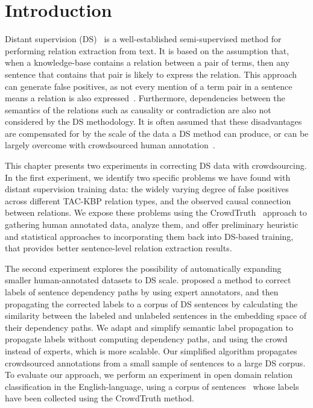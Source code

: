 \section{Introduction}


Distant supervision (DS)~\cite{mintz2009distant,Welty:2010:LSR} is a well-established semi-supervised method for performing relation extraction from text. It is based on the assumption that, when a knowledge-base contains a relation between a pair of terms, then any sentence that contains that pair is likely to express the relation. This approach can generate false positives, as not every mention of a term pair in a sentence means a relation is also expressed~\cite{DBLP:conf/ijcai/FengGQLL17}. Furthermore, dependencies between the semantics of the relations such as causality or contradiction are also not considered by the DS methodology. It is often assumed that these disadvantages are compensated for by the scale of the data a DS method can produce, or can be largely overcome with crowdsourced human annotation~\cite{angeli2014combining,liu2016effective}.  

This chapter presents two experiments in correcting DS data with crowdsourcing. In the first experiment, we identify two specific problems we have found with distant supervision training data: the widely varying degree of false positives across different TAC-KBP relation types, and the observed causal connection between relations. We expose these problems using the CrowdTruth~\cite{aroyo2014threesides,aroyo2015truth,aroyo2013crowd} approach to gathering human annotated data, analyze them, and offer preliminary heuristic and statistical approaches to incorporating them back into DS-based training, that provides better sentence-level relation extraction results. %

The second experiment explores the possibility of automatically expanding smaller human-annotated datasets to DS scale. \citet{sterckx2016knowledge} proposed a method to correct labels of sentence dependency paths by using expert annotators, and then propagating the corrected labels to a corpus of DS sentences by calculating the similarity between the labeled and unlabeled sentences in the embedding space of their dependency paths. We adapt and simplify semantic label propagation to propagate labels without computing dependency paths, and using the crowd instead of experts, which is more scalable. Our simplified algorithm propagates crowdsourced annotations from a small sample of sentences to a large DS corpus. To evaluate our approach, we perform an experiment in open domain relation classification in the English-language, using a corpus of sentences~\cite{dumitrache2017false} whose labels have been collected using the CrowdTruth method.


